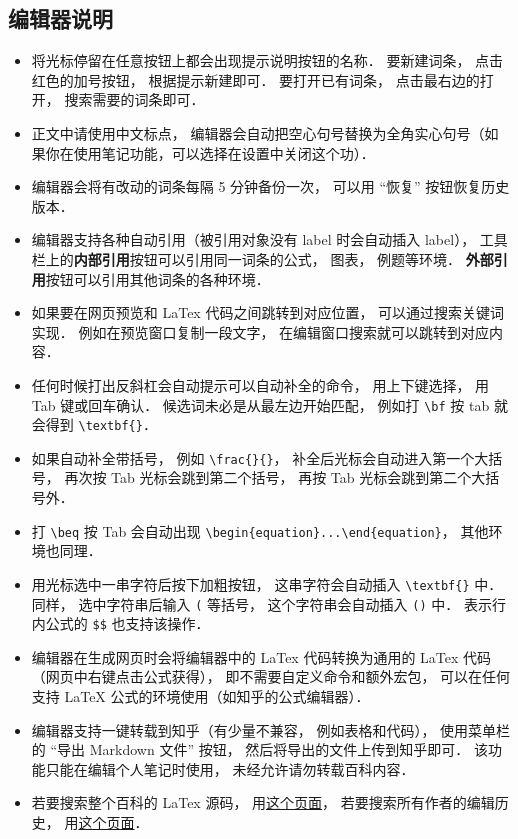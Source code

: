 \subsection{编辑器说明}
\begin{itemize}
\item 将光标停留在任意按钮上都会出现提示说明按钮的名称． 要新建词条， 点击红色的加号按钮， 根据提示新建即可． 要打开已有词条， 点击最右边的打开， 搜索需要的词条即可．
\item 正文中请使用中文标点， 编辑器会自动把空心句号替换为全角实心句号（如果你在使用笔记功能，可以选择在设置中关闭这个功）．
\item 编辑器会将有改动的词条每隔 5 分钟备份一次， 可以用 “恢复” 按钮恢复历史版本．
\item 编辑器支持各种自动引用（被引用对象没有 label 时会自动插入 label）， 工具栏上的\textbf{内部引用}按钮可以引用同一词条的公式， 图表， 例题等环境． \textbf{外部引用}按钮可以引用其他词条的各种环境．
\item 如果要在网页预览和 LaTex 代码之间跳转到对应位置， 可以通过搜索关键词实现． 例如在预览窗口复制一段文字， 在编辑窗口搜索就可以跳转到对应内容．
\item 任何时候打出反斜杠会自动提示可以自动补全的命令， 用上下键选择， 用 Tab 键或回车确认． 候选词未必是从最左边开始匹配， 例如打 \verb|\bf| 按 tab 就会得到 \verb|\textbf{}|．
\item 如果自动补全带括号， 例如 \verb|\frac{}{}|， 补全后光标会自动进入第一个大括号， 再次按 Tab 光标会跳到第二个括号， 再按 Tab 光标会跳到第二个大括号外．
\item 打 \verb|\beq| 按 Tab 会自动出现 \verb|\begin{equation}...\end{equation}|， 其他环境也同理．
\item 用光标选中一串字符后按下加粗按钮， 这串字符会自动插入 \verb|\textbf{}| 中． 同样， 选中字符串后输入 \verb|(| 等括号， 这个字符串会自动插入 \verb|()| 中． 表示行内公式的 \verb|$$| 也支持该操作．
\item 编辑器在生成网页时会将编辑器中的 LaTex 代码转换为通用的 LaTex 代码（网页中右键点击公式获得）， 即不需要自定义命令和额外宏包， 可以在任何支持 LaTeX 公式的环境使用（如知乎的公式编辑器）．
\item 编辑器支持一键转载到知乎（有少量不兼容， 例如表格和代码）， 使用菜单栏的 “导出 Markdown 文件” 按钮， 然后将导出的文件上传到知乎即可． 该功能只能在编辑个人笔记时使用， 未经允许请勿转载百科内容．
\item 若要搜索整个百科的 LaTex 源码， 用\href{https://github.com/MacroUniverse/PhysWiki/tree/master/contents}{这个页面}， 若要搜索所有作者的编辑历史， 用\href{https://github.com/MacroUniverse/PhysWiki-backup}{这个页面}．
\end{itemize}

